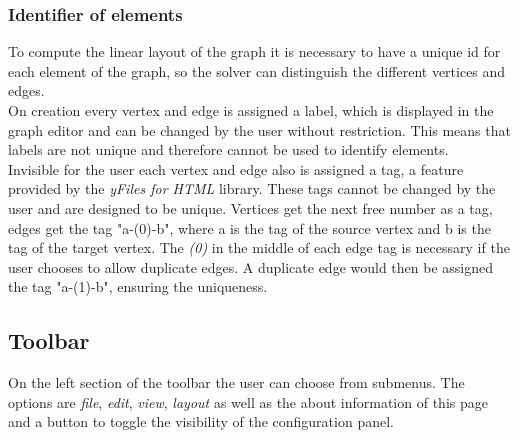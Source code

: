 \subsubsection{Identifier of elements}
To compute the linear layout of the graph it is necessary to have a unique id for each element of the graph, so the solver can distinguish the different vertices and edges.\\
On creation every vertex and edge is assigned a label, which is displayed in the graph editor and can be changed by the user without restriction. This means that labels are not unique and therefore cannot be used to identify elements.\\
Invisible for the user each vertex and edge also is assigned a tag, a feature provided by the \textit{yFiles for HTML} library. These tags cannot be changed by the user and are designed to be unique. Vertices get the next free number as a tag, edges get the tag "a-(0)-b", where a is the tag of the source vertex and b is the tag of the target vertex. The \textit{(0)} in the middle of each edge tag is necessary if the user chooses to allow duplicate edges. A duplicate edge would then be assigned the tag "a-(1)-b", ensuring the uniqueness.
\subsection{Toolbar}
On the left section of the toolbar the user can choose from submenus. The options are \textit{file}, \textit{edit}, \textit{view}, \textit{layout} as well as the about information of this page and a button to toggle the visibility of the configuration panel.
